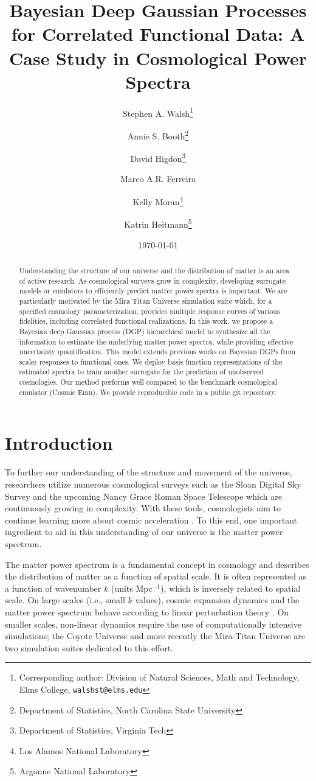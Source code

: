 \documentclass[11pt]{article}
\title{Bayesian Deep Gaussian Processes for Correlated Functional Data: 
        A Case Study in Cosmological Power Spectra}
\author{Stephen A. Walsh\thanks{Corresponding author: Division of Natural Sciences, 
        Math and Technology, Elms College, {\tt walshst@elms.edu}} \and 
        Annie S. Booth\thanks{Department of Statistics, North Carolina State University} \and
        David Higdon\thanks{Department of Statistics, Virginia Tech} \and
        Marco A.R. Ferreira\footnotemark[3] \and
        Kelly Moran\thanks{Los Alamos National Laboratory} \and
        Katrin Heitmann\thanks{Argonne National Laboratory}}
\date{\today}
\begin{document}
\maketitle
\bigskip

\begin{abstract} 
Understanding the structure of our universe and the distribution of matter is an 
area of active research.  As cosmological surveys grow in complexity, developing 
surrogate models or emulators to efficiently predict matter power spectra is 
important.  We are particularly motivated by the Mira Titan Universe simulation
suite which, for a specified cosmology parameterization, provides multiple response
curves of various fidelities, including correlated functional realizations.
In this work, we propose a Bayesian deep Gaussian process (DGP) hierarchical 
model to synthesize all the information to estimate the underlying matter power
spectra, while providing effective uncertainty quantification.  This model
extends previous works on Bayesian DGPs from scaler responses to functional ones.
We deploy basis function representations of the estimated spectra to train another
surrogate for the prediction of unobserved cosmologies.  Our method performs well
compared to the benchmark cosmological emulator (Cosmic Emu).  We provide
reproducible code in a public git repository.
\end{abstract}


\section{Introduction}

To further our understanding of the structure and movement of the universe, researchers utilize numerous cosmological surveys such as the Sloan Digital Sky Survey \citep{york2000sloan} and the upcoming Nancy Grace Roman Space Telescope \citep{Dore2019WFIRST} which are continuously growing in complexity. With these tools, cosmologists aim to continue learning more about cosmic acceleration \citep{caldwell2009physics}. To this end, one important ingredient to aid in this understanding of our universe is the matter power spectrum. 

The matter power spectrum is a fundamental concept in cosmology and describes the distribution of matter as a function of spatial scale. It is often represented as a function of wavenumber $k$ (units Mpc$^{-1}$), which is inversely related to spatial scale. On large scales (i.e., small $k$ values), cosmic expansion dynamics and the matter power spectrum behave according to linear perturbation theory \citep{pietroni2008flowing, lesgourgues2009non}. On smaller scales, non-linear dynamics require the use of computationally intensive simulations; the Coyote Universe \citep{lawrence2010coyote} and more recently the Mira-Titan Universe \citep{moran2023mira} are two simulation suites dedicated to this effort. 
\end{document}
